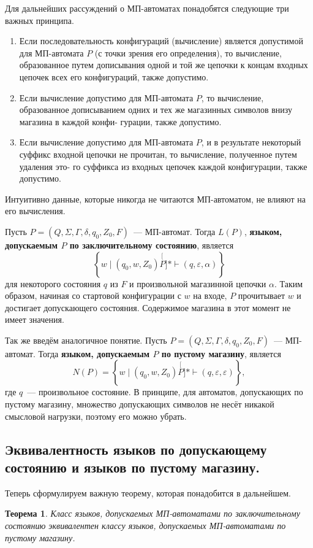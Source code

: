 \documentclass[a4paper,12pt]{article}
\newtheorem*{theorem}{Теорема}
\begin{document}
	Для дальнейших рассуждений о МП-автоматах понадобятся следующие три важных принципа.
	\begin{enumerate}
		\item Если последовательность конфигураций (вычисление) является допустимой для МП-автомата \(P\) (с точки зрения его определения), то вычисление, образованное путем дописывания одной и той же цепочки к концам входных цепочек всех его конфигураций, также допустимо.
		\item Если вычисление допустимо для МП-автомата \(P\), то вычисление, образованное дописыванием одних и тех же магазинных символов внизу магазина в каждой конфи- гурации, также допустимо.
		\item Если вычисление допустимо для МП-автомата \(P\), и в результате некоторый суффикс входной цепочки не прочитан, то вычисление, полученное путем удаления это- го суффикса из входных цепочек каждой конфигурации, также допустимо.
	\end{enumerate}
Интуитивно данные, которые никогда не читаются МП-автоматом, не влияют на его вычисления.

Пусть \(P = (Q, \Sigma, \Gamma, \delta, q_0, Z_0, F)\)~--- МП-автомат. Тогда \(L(P)\), \textbf{языком, допускаемым \(P\) по заключительному состоянию}, является
\[\left\{w \mid (q_0, w, Z_0) \stackrel[P]{*}{\vdash} (q, \varepsilon, \alpha)\right\}\]
для некоторого состояния \(q\) из \(F\) и произвольной магазинной цепочки \(\alpha\). Таким образом, начиная со стартовой конфигурации с \(w\) на входе, \(P\) прочитывает \(w\) и достигает допускающего состояния. Содержимое магазина в этот момент не имеет значения.

Так же введём аналогичное понятие.
Пусть \(P = (Q, \Sigma, \Gamma, \delta, q_0, Z_0, F)\)~--- МП-автомат. Тогда \textbf{языком, допускаемым \(P\) по пустому магазину}, является 
\[N(P) = \left\{w \mid (q_0, w, Z_0) \stackrel[P]{*}{\vdash} (q, \varepsilon, \varepsilon)\right\},\]
где \(q\)~--- произвольное состояние. В принципе, для автоматов, допускающих по пустому магазину, множество допускающих символов не несёт никакой смысловой нагрузки, поэтому его можно убрать.

\subsection{Эквивалентность языков по допускающему состоянию и языков по пустому магазину.}
Теперь сформулируем важную теорему, которая понадобится в дальнейшем.
\begin{theorem}
	Класс языков, допускаемых МП-автоматами по заключительному состоянию эквивалентен классу языков, допускаемых МП-автоматами по пустому магазину.
\end{theorem}
\end{document}
